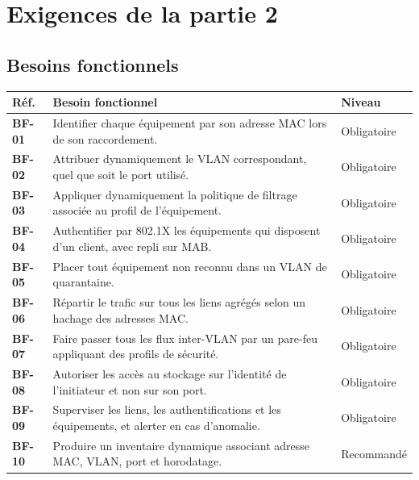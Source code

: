 \documentclass[11pt,a4paper]{article}
\newcommand{\rid}[1]{\textcolor{primary}{\textbf{\small #1}}}
\begin{document}
\section{Exigences de la partie 2}

\subsection{Besoins fonctionnels}
\begin{table}[H]
\centering
\begin{tabularx}{\textwidth}{L{1.4cm} Y C{2.3cm}}
\toprule
{}\textbf{Réf.} & \textbf{Besoin fonctionnel} & \textbf{Niveau} \\
\midrule
\rid{BF-01} & Identifier chaque équipement par son adresse MAC lors de son raccordement. & Obligatoire \\
\rid{BF-02} & Attribuer dynamiquement le VLAN correspondant, quel que soit le port utilisé. & Obligatoire \\
\rid{BF-03} & Appliquer dynamiquement la politique de filtrage associée au profil de l'équipement. & Obligatoire \\
\rid{BF-04} & Authentifier par 802.1X les équipements qui disposent d'un client, avec repli sur MAB. & Obligatoire \\
\rid{BF-05} & Placer tout équipement non reconnu dans un VLAN de quarantaine. & Obligatoire \\
\rid{BF-06} & Répartir le trafic sur tous les liens agrégés selon un hachage des adresses MAC. & Obligatoire \\
\rid{BF-07} & Faire passer tous les flux inter-VLAN par un pare-feu appliquant des profils de sécurité. & Obligatoire \\
\rid{BF-08} & Autoriser les accès au stockage sur l'identité de l'initiateur et non sur son port. & Obligatoire \\
\rid{BF-09} & Superviser les liens, les authentifications et les équipements, et alerter en cas d'anomalie. & Obligatoire \\
\rid{BF-10} & Produire un inventaire dynamique associant adresse MAC, VLAN, port et horodatage. & Recommandé \\
\bottomrule
\end{tabularx}
\end{table}
\end{document}
